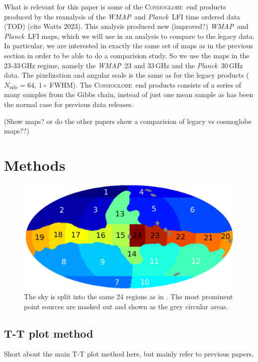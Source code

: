 \documentclass[twocolumn]{../../common/aa}
\def\WMAP{\emph{WMAP}}
\def\Planck{\emph{Planck}}
\newcommand{\cosmoglobe}{\textsc{Cosmoglobe}}
\begin{document}
What is relevant for this paper is some of the \cosmoglobe\ end products produced by the reanalysis of the \WMAP\ and \Planck\ LFI time ordered data (TOD) (cite Watts 2023). This analysis produced new (improved?) \WMAP\ and \Planck\ LFI maps, which we will use in an analysis to compare to the legacy data. In particular, we are interested in exactly the same set of maps as in the previous section in order to be able to do a comparision study. So we use the maps in the 23-33\,GHz regime, namely the \WMAP\ 23 and 33\,GHz and the \Planck\ 30\,GHz data. The pixelization and angular scale is the same as for the legacy products ($N_\textrm{side}=64$, $1\circ$ FWHM). The \cosmoglobe\ end products consists of a series of many samples from the Gibbs chain, instead of just one mean sample as has been the normal case for previous data releases.

(Show maps? or do the other papers show a comparision of legacy vs cosmoglobe maps??)


\section{Methods}
\label{sec:methods}

\begin{figure}
        \centering
        \includegraphics[width=\linewidth]{figures/utnymaske_tall_converted.pdf}
        \caption{The sky is split into the same 24 regions as in \citet{fuskeland2014}. The most prominent point sources are masked out and shown as the grey circular areas.
        }
        \label{fig:regions}
\end{figure}


\subsection{T-T plot method}
\label{sec:ttplot}
Short about the main T-T plot method here, but mainly refer to previous papers.
\end{document}
